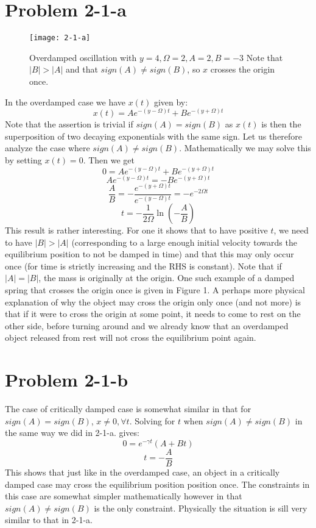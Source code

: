 
\section*{Problem 2-1-a}
\begin{wrapfigure}{r}{0.5\textwidth}
\texttt{[image: 2-1-a]}
\label{fig:2-1-a}
\caption{Overdamped oscillation with $y=4,\Omega=2,A=2,B=-3$ Note that $|B|>|A|$ and that $sign(A)\neq sign(B)$, so $x$ crosses the origin once.
}
\vspace{40pt}
\end{wrapfigure}
In the overdamped case we have $x(t)$ given by:
\[ x(t) = Ae^{-(y-\Omega)t} + Be^{-(y+\Omega)t} \]
Note that the assertion is trivial if $sign(A)=sign(B)$ as $x(t)$ is then the superposition of two decaying exponentials with the same sign. Let us therefore analyze the case where $sign(A)\neq sign(B)$. Mathematically we may solve this by setting $x(t)=0$. Then we get
\[ 0 =  Ae^{-(y-\Omega)t} + Be^{-(y+\Omega)t} \]
\[ Ae^{-(y-\Omega)t} = -Be^{-(y+\Omega)t} \]
\[ \dfrac{A}{B} = -\dfrac{e^{-(y+\Omega)t}}{e^{-(y-\Omega)t}} = -e^{-2\Omega t} \]
\[ t = -\frac{1}{2\Omega} \ln\left(-\frac{A}{B}\right) \]
This result is rather interesting. For one it shows that to have positive $t$, we need to have $|B|>|A|$ (corresponding to a large enough initial velocity towards the equilibrium position to not be damped in time) and that this may only occur once (for time is strictly increasing and the RHS is constant). Note that if $|A|=|B|$, the mass is originally at the origin.
One such example of a damped spring that crosses the origin once is given in Figure 1. A perhaps more physical explanation of why the object may cross the origin only once (and not more) is that if it were to cross the origin at some point, it needs to come to rest on the other side, before turning around and we already know that an overdamped object released from rest will not cross the equilibrium point again.
\section*{Problem 2-1-b}
The case of critically damped case is somewhat similar in that for $sign(A)=sign(B)$, $x\neq 0, \forall t$. Solving for $t$ when $sign(A)\neq sign(B)$  in the same way we did in 2-1-a. gives:
\[ 0 = e^{-\gamma t}(A+Bt) \]
\[ t = -\frac{A}{B} \]
This shows that just like in the overdamped case, an object in a critically damped case may cross the equilibrium position position once. The constraints in this case are somewhat simpler mathematically however in that $sign(A)\neq sign(B)$ is the only constraint. Physically the situation is sill very similar to that in 2-1-a.
